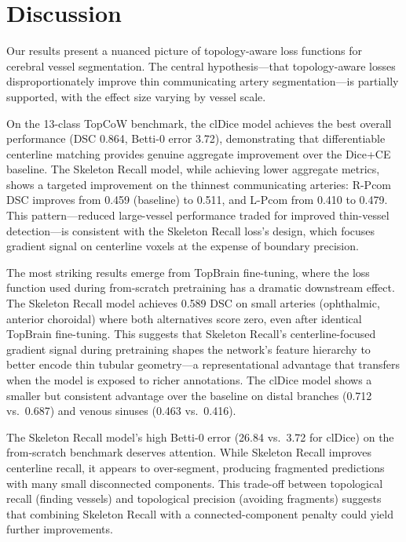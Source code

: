 \documentclass[conference]{IEEEtran}
\begin{document}
\section{Discussion}

Our results present a nuanced picture of topology-aware loss functions for cerebral vessel segmentation. The central hypothesis---that topology-aware losses disproportionately improve thin communicating artery segmentation---is partially supported, with the effect size varying by vessel scale.

On the 13-class TopCoW benchmark, the clDice model achieves the best overall performance (DSC 0.864, Betti-0 error 3.72), demonstrating that differentiable centerline matching provides genuine aggregate improvement over the Dice+CE baseline. The Skeleton Recall model, while achieving lower aggregate metrics, shows a targeted improvement on the thinnest communicating arteries: R-Pcom DSC improves from 0.459 (baseline) to 0.511, and L-Pcom from 0.410 to 0.479. This pattern---reduced large-vessel performance traded for improved thin-vessel detection---is consistent with the Skeleton Recall loss's design, which focuses gradient signal on centerline voxels at the expense of boundary precision.

The most striking results emerge from TopBrain fine-tuning, where the loss function used during from-scratch pretraining has a dramatic downstream effect. The Skeleton Recall model achieves 0.589 DSC on small arteries (ophthalmic, anterior choroidal) where both alternatives score zero, even after identical TopBrain fine-tuning. This suggests that Skeleton Recall's centerline-focused gradient signal during pretraining shapes the network's feature hierarchy to better encode thin tubular geometry---a representational advantage that transfers when the model is exposed to richer annotations. The clDice model shows a smaller but consistent advantage over the baseline on distal branches (0.712 vs.\ 0.687) and venous sinuses (0.463 vs.\ 0.416).

The Skeleton Recall model's high Betti-0 error (26.84 vs.\ 3.72 for clDice) on the from-scratch benchmark deserves attention. While Skeleton Recall improves centerline recall, it appears to over-segment, producing fragmented predictions with many small disconnected components. This trade-off between topological recall (finding vessels) and topological precision (avoiding fragments) suggests that combining Skeleton Recall with a connected-component penalty could yield further improvements.
\end{document}
